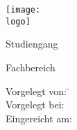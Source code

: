 \begin{titlepage}

    \begin{minipage}{\textwidth}
        \noindent \hfill \texttt{[image: \\logo]}
    \end{minipage}
    \vspace{6em}

    \begin{center}
        {\huge \art}

        {\Large Studiengang \studiengang}

        \vspace{4em}

        \textbf{{\Large \titel}}

        \vspace{4em}

        \hochschule

        \hochschulezusatz

        Fachbereich \fachbereich

        \vspace{6em}

        \begin{minipage}{\textwidth}
            \begin{tabbing}

                Vorgelegt von:  \hspace*{2em}\= \autor \\
                Vorgelegt bei: \> \betreuer \\
                Eingereicht am: \> \datumAbgabe
            \end{tabbing}

        \end{minipage}
    \end{center}
\end{titlepage}
